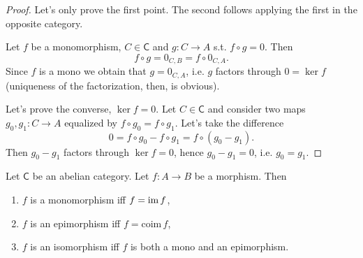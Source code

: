 \documentclass[../Main]{subfiles}
\begin{document}
\begin{proof}
	Let's only prove the first point.
	The second follows applying the first in the opposite category.

	Let $f$ be a monomorphism, $C \in \mathsf{C}$ and $g\colon C \to A$
	s.t. $f \circ g = 0$.
	Then 
	\begin{equation}
	f \circ g = 0_{C,B} = f \circ 0_{C,A}
	.\end{equation} 
	Since $f$ is a mono we obtain that $g = 0_{C,A}$,
	i.e. $g$ factors through $0 = \ker f$ (uniqueness of
	the factorization, then, is obvious).

	Let's prove the converse, $\ker f = 0$.
	Let $C \in \mathsf{C}$ and consider two maps $g_0, g_1\colon C \to A$
	equalized by $f \circ g_0 = f \circ g_1$.
	Let's take the difference
	\begin{equation}
		0 = f \circ g_0 - f \circ g_1 = f \circ (g_0 - g_1)
	.\end{equation} 
	Then $g_0 - g_1$ factors through $\ker f = 0$, hence $g_0 - g_1 = 0$, 
	i.e. $g_0 = g_1$.
\end{proof}

\begin{exr}
	Let $\mathsf{C}$ be an abelian category.
	Let $f\colon A \to B$ be a morphism. Then
	\begin{enumerate}
		\item $f$ is a monomorphism iff $f = \operatorname{im} f$,
		\item $f$ is an epimorphism iff $f = \mathrm{coim}\, f$,
		\item $f$ is an isomorphism iff $f$ is both a mono and an epimorphism.
	\end{enumerate}
\end{exr} 
\end{document}
